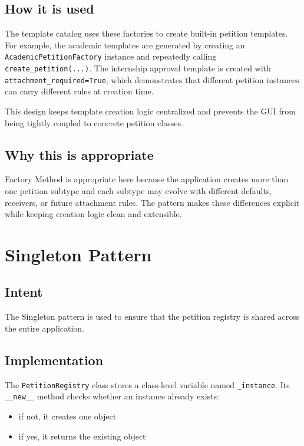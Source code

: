 \documentclass[11pt,a4paper]{article}
\begin{document}
\subsection{How it is used}

The template catalog uses these factories to create built-in petition templates.
For example, the academic templates are generated by creating an
\texttt{AcademicPetitionFactory} instance and repeatedly calling
\texttt{create\_petition(...)}. The internship approval template is created
with \texttt{attachment\_required=True}, which demonstrates that different
petition instances can carry different rules at creation time.

This design keeps template creation logic centralized and prevents the GUI from
being tightly coupled to concrete petition classes.

\subsection{Why this is appropriate}

Factory Method is appropriate here because the application creates more than one
petition subtype and each subtype may evolve with different defaults, receivers,
or future attachment rules. The pattern makes these differences explicit while
keeping creation logic clean and extensible.

\section{Singleton Pattern}

\subsection{Intent}

The Singleton pattern is used to ensure that the petition registry is shared
across the entire application.

\subsection{Implementation}

The \texttt{PetitionRegistry} class stores a class-level variable named
\texttt{\_instance}. Its \texttt{\_\_new\_\_} method checks whether an instance
already exists:
\begin{itemize}[leftmargin=1.5em]
    \item if not, it creates one object
    \item if yes, it returns the existing object
\end{itemize}
\end{document}
